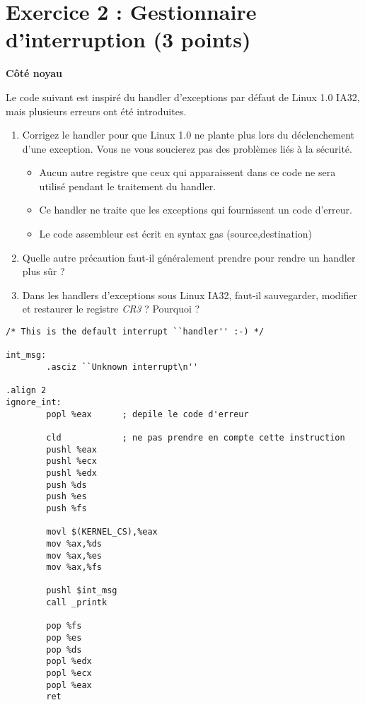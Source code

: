 \section*{Exercice 2 : Gestionnaire d'interruption (3 points)}

{\bf C\^ot\'e noyau}

Le code suivant est inspir\'e du handler d'exceptions par d\'efaut de Linux 1.0 IA32, mais plusieurs erreurs ont \'et\'e introduites.

\begin{enumerate}
\item Corrigez le handler pour que Linux 1.0 ne plante plus lors du d\'eclenchement d'une exception. Vous ne vous soucierez pas des probl\`emes li\'es \`a la s\'ecurit\'e.
\begin{itemize}
\item Aucun autre registre que ceux qui apparaissent dans ce code ne sera utilis\'e pendant le traitement du handler.
\item Ce handler ne traite que les exceptions qui fournissent un code d'erreur.
\item Le code assembleur est \'ecrit en syntax gas (source,destination)
\end{itemize}

\item Quelle autre pr\'ecaution faut-il g\'en\'eralement prendre pour rendre un handler plus s\^ur ?

\item Dans les handlers d'exceptions sous Linux IA32, faut-il sauvegarder, modifier et restaurer le registre {\em CR3} ? Pourquoi ?
\end{enumerate}



\begin{verbatim}
/* This is the default interrupt ``handler'' :-) */

int_msg:
        .asciz ``Unknown interrupt\n''

.align 2
ignore_int:
        popl %eax      ; depile le code d'erreur

        cld            ; ne pas prendre en compte cette instruction
        pushl %eax
        pushl %ecx
        pushl %edx
        push %ds
        push %es
        push %fs

        movl $(KERNEL_CS),%eax
        mov %ax,%ds
        mov %ax,%es
        mov %ax,%fs

        pushl $int_msg
        call _printk

        pop %fs
        pop %es
        pop %ds
        popl %edx
        popl %ecx
        popl %eax
        ret
\end{verbatim}




